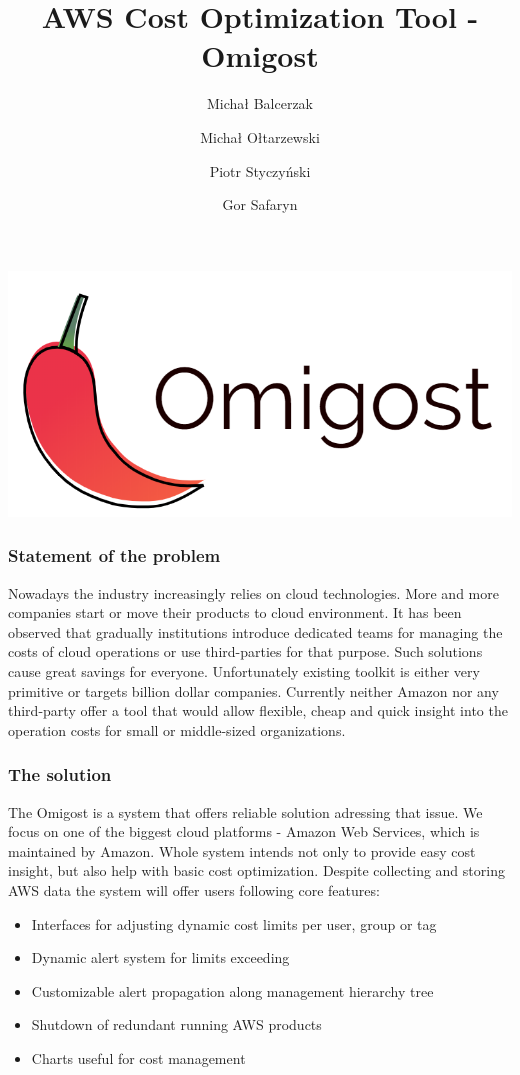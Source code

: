 \documentclass[licencjacka,en]{thesisclass}
\author{
  Michał Balcerzak
  \and
  Michał Ołtarzewski
  \and
  Piotr Styczyński
  \and
  Gor Safaryn
}
\title{AWS Cost Optimization Tool - Omigost}
\begin{document}
\includegraphics[width=\textwidth*\real{0.6}]{imgs/logo.png}

\subsubsection{Statement of the problem}

Nowadays the industry increasingly relies on cloud technologies. More and more companies start or move their products to cloud environment.
It has been observed that gradually institutions introduce dedicated teams for managing the costs of cloud operations or use third-parties for that purpose. Such solutions cause great savings for everyone.
Unfortunately existing toolkit is either very primitive or targets billion dollar companies. Currently neither Amazon nor any third-party offer a tool that would allow flexible, cheap and quick insight into the operation costs for small or middle-sized organizations.

\subsubsection{The solution}

The Omigost is a system that offers reliable solution adressing that issue. We focus on one of the biggest cloud platforms - Amazon Web Services, which is maintained by Amazon.
Whole system intends not only to provide easy cost insight, but also help with basic cost optimization.
Despite collecting and storing AWS data the system will offer users following core features:

\begin{itemize}
  \item Interfaces for adjusting dynamic cost limits per user, group or tag
  \item Dynamic alert system for limits exceeding
  \item Customizable alert propagation along management hierarchy tree
  \item Shutdown of redundant running AWS products
  \item Charts useful for cost management
\end{itemize}
\end{document}
